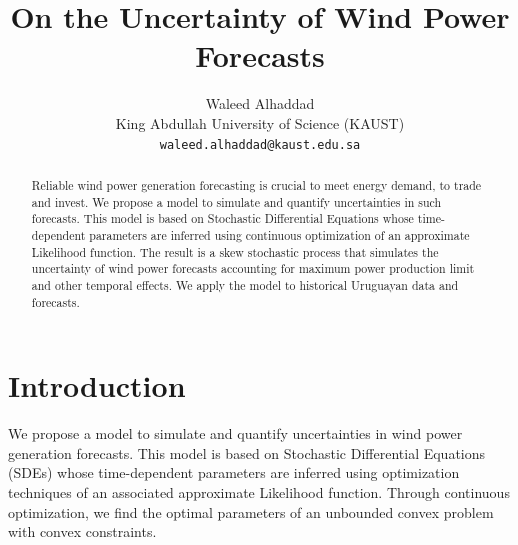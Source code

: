 \documentclass[10pt,twocolumn,letterpaper]{article}
\begin{document}
\title{ On the Uncertainty of Wind Power Forecasts }  %

\author{Waleed  Alhaddad\\
King Abdullah University of Science (KAUST)\\
{\tt\small waleed.alhaddad@kaust.edu.sa}
\and
}

\maketitle


\begin{abstract}
Reliable wind power generation forecasting is crucial to meet energy demand, to trade and invest. We propose a model to simulate and quantify uncertainties in such forecasts. This model is based on Stochastic Differential Equations whose time-dependent parameters are inferred using continuous optimization of an approximate Likelihood function. The result is a skew stochastic process that simulates the uncertainty of wind power forecasts accounting for maximum power production limit and other temporal effects. We apply the model to historical Uruguayan data and forecasts.
\end{abstract}

\section{Introduction}

    We propose a model to simulate and quantify uncertainties in wind power generation forecasts. This model is based on Stochastic Differential Equations (SDEs) whose time-dependent parameters are inferred using optimization techniques of an associated approximate Likelihood function. Through continuous optimization, we find the optimal parameters of an unbounded convex problem with convex constraints.
\end{document}
